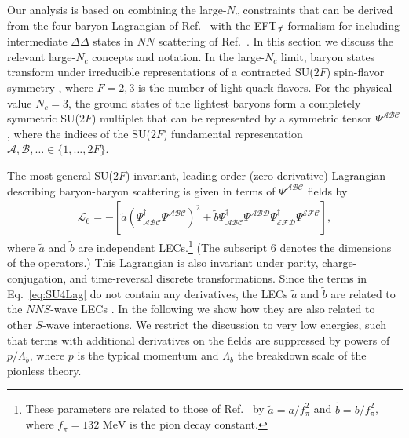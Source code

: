 \documentclass[nofootinbib, preprint, aps, prc, superscriptaddress,11pt]{revtex4-1}
\newcommand{\Nc}{\ensuremath{N_c}\xspace}
\newcommand{\NN}{\ensuremath{N\!N}\xspace}
\newcommand\Swave{$S$-wave\xspace}
\newcommand{\calL}{\ensuremath{\mathcal{L}}}
\newcommand{\1}{\mathbbm{1}}
\newcommand{\at}{\ensuremath{\tilde{a}}\xspace}
\newcommand{\bt}{\ensuremath{\tilde{b}}\xspace}
\newcommand{\nopi}{\ensuremath{\pi\hskip-0.40em /}}
\newcommand{\eftnopi}{EFT$_{\nopi}$\xspace}
\newcommand{\DD}{\ensuremath{\Delta\Delta}\xspace}
\begin{document}
Our analysis is based on combining the large-\Nc constraints that can be derived from the four-baryon Lagrangian of Ref.~\cite{Kaplan:1995yg} with the \eftnopi formalism for including intermediate \DD states in \NN scattering of Ref.~\cite{Savage:1996tb}.
In this section we discuss the relevant large-\Nc concepts and notation.
In the large-\Nc limit,  baryon states transform under irreducible representations of a contracted  SU($2F$) spin-flavor symmetry \cite{Gervais:1983wq,Dashen:1993as,Jenkins:1993af,Dashen:1993jt,Dashen:1994qi}, where $F=2,3$ is the number of light quark flavors. 
For the physical value $\Nc = 3$, the ground states of the  lightest baryons form a completely symmetric SU($2F$) multiplet that can be represented by a symmetric tensor 
$\Psi^{\mathcal{A}\mathcal{B}\mathcal{C}}$, where the indices of the  SU($2F$) fundamental representation $\mathcal{A},\mathcal{B},\ldots \in \{1, \ldots, 2F \}$.

The  most general SU($2F$)-invariant, leading-order (zero-derivative) Lagrangian describing  baryon-baryon scattering  is given in terms of $\Psi^{\mathcal{A}\mathcal{B}\mathcal{C}}$ fields by
\cite{Kaplan:1995yg}
\begin{align}
\label{eq:SU4Lag}
    \calL_6 = -\left[ \at\left( \Psi^\dagger_{\mathcal{A}\mathcal{B}\mathcal{C}} \Psi^{\mathcal{A}\mathcal{B}\mathcal{C}}\right)^2 + \bt \Psi^\dagger_{\mathcal{A}\mathcal{B}\mathcal{C}} \Psi^{\mathcal{A}\mathcal{B}\mathcal{D}}\Psi^\dagger_{\mathcal{E}\mathcal{F}\mathcal{D}} \Psi^{\mathcal{E}\mathcal{F}\mathcal{C}}\right],
\end{align}
where $\at$ and $\bt$ are independent LECs.\footnote{These parameters are related to those of Ref.~\cite{Kaplan:1995yg} by $\at = a/f_\pi^2$ and $\bt = b/f_\pi^2$, where $f_\pi =132 \text{ MeV}$ is the pion decay constant.} (The subscript 6 denotes the dimensions of the operators.) This  Lagrangian is also invariant under parity, charge-conjugation, and time-reversal discrete transformations.
Since the terms in Eq.~\eqref{eq:SU4Lag} do not contain any derivatives, the LECs $\at$ and $\bt$ are related to the \NN \Swave LECs \cite{Kaplan:1995yg}. In the following we show how they are also related to other \Swave interactions.
We restrict the discussion to very low energies, such that terms with additional derivatives on the fields are suppressed by powers of $p/\Lambda_b$, where $p$ is the typical momentum and $\Lambda_b$ the breakdown scale of the pionless theory.
\end{document}
